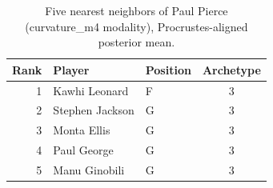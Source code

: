 \begin{table}[htbp]
  \centering\small
  \begin{tabular}{rllc}
    \toprule
    Rank & Player & Position & Archetype \\
    \midrule
    1 & Kawhi Leonard & F & 3 \\
    2 & Stephen Jackson & G & 3 \\
    3 & Monta Ellis & G & 3 \\
    4 & Paul George & G & 3 \\
    5 & Manu Ginobili & G & 3 \\
    \bottomrule
  \end{tabular}
  \caption{Five nearest neighbors of Paul Pierce (curvature_m4 modality), Procrustes-aligned posterior mean.}
  \label{tab:Paul_Pierce_neighbors_curvature_m4}
\end{table}

